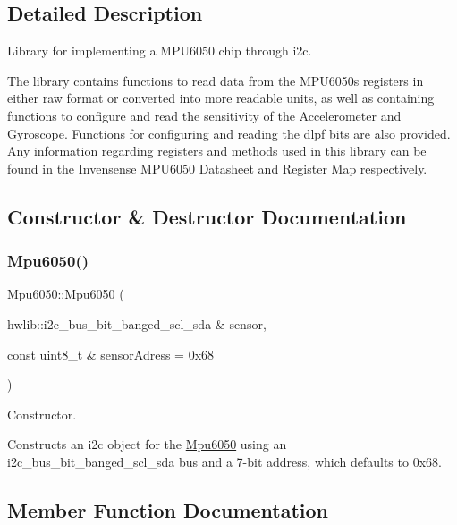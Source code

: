 \subsection{Detailed Description}
Library for implementing a M\+P\+U6050 chip through i2c. 

The library contains functions to read data from the M\+P\+U6050\textquotesingle{}s registers in either raw format or converted into more readable units, as well as containing functions to configure and read the sensitivity of the Accelerometer and Gyroscope. Functions for configuring and reading the dlpf bits are also provided. Any information regarding registers and methods used in this library can be found in the Invensense M\+P\+U6050 Datasheet and Register Map respectively. 

\subsection{Constructor \& Destructor Documentation}
\mbox{\label{classMpu6050_af7beb7081101ae8d99452211c1d06789}} 
\subsubsection{\texorpdfstring{Mpu6050()}{Mpu6050()}}
{\footnotesize\ttfamily Mpu6050\+::\+Mpu6050 (\begin{DoxyParamCaption}\item[{hwlib\+::i2c\+\_\+bus\+\_\+bit\+\_\+banged\+\_\+scl\+\_\+sda \&}]{sensor,  }\item[{const uint8\+\_\+t \&}]{sensor\+Adress = {\ttfamily 0x68} }\end{DoxyParamCaption})}



Constructor. 

Constructs an i2c object for the \hyperlink{classMpu6050}{Mpu6050} using an i2c\+\_\+bus\+\_\+bit\+\_\+banged\+\_\+scl\+\_\+sda bus and a 7-\/bit address, which defaults to 0x68. 

\subsection{Member Function Documentation}
\mbox{\label{classMpu6050_ae3064b01d13a3ec5288d490a94cf5109}} 
